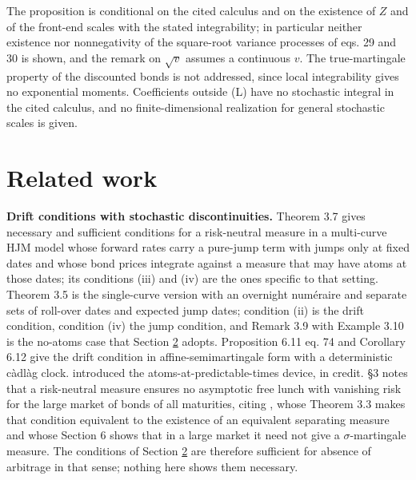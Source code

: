 \documentclass[11pt]{article}
\begin{document}
The proposition is conditional on the cited calculus and on the existence of \(Z\) and of the front-end scales with the stated integrability; in particular neither existence nor nonnegativity of the square-root variance processes of \cite{brace2024sofr} eqs. 29 and 30 is shown, and the remark on \(\sqrt v\) assumes a continuous \(v\). The true-martingale property of the discounted bonds is not addressed, since local integrability gives no exponential moments. Coefficients outside (L) have no stochastic integral in the cited calculus, and no finite-dimensional realization for general stochastic scales is given.

\section{Related work}\label{sec:4}

\textbf{Drift conditions with stochastic discontinuities.} \cite{fontana2018term} Theorem 3.7 gives necessary and sufficient conditions for a risk-neutral measure in a multi-curve HJM model whose forward rates carry a pure-jump term with jumps only at fixed dates and whose bond prices integrate against a measure that may have atoms at those dates; its conditions (iii) and (iv) are the ones specific to that setting. \cite{fontana2022term} Theorem 3.5 is the single-curve version with an overnight numéraire and separate sets of roll-over dates and expected jump dates; condition (ii) is the drift condition, condition (iv) the jump condition, and Remark 3.9 with Example 3.10 is the no-atoms case that Section \hyperref[sec:2]{2} adopts. \cite{kellerressel2018affine} Proposition 6.11 eq. 74 and Corollary 6.12 give the drift condition in affine-semimartingale form with a deterministic càdlàg clock. \cite{gehmlich2016dynamic} introduced the atoms-at-predictable-times device, in credit. \cite{fontana2022term} §3 notes that a risk-neutral measure ensures no asymptotic free lunch with vanishing risk for the large market of bonds of all maturities, citing \cite{cuchiero2014perspective}, whose Theorem 3.3 makes that condition equivalent to the existence of an equivalent separating measure and whose Section 6 shows that in a large market it need not give a \(\sigma\)-martingale measure. The conditions of Section \hyperref[sec:2]{2} are therefore sufficient for absence of arbitrage in that sense; nothing here shows them necessary.
\end{document}
